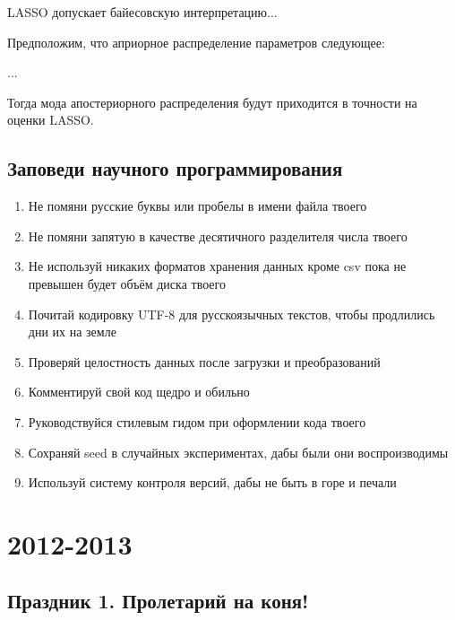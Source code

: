 \documentclass[12pt, a4paper]{article}\usepackage[]{graphicx}\usepackage[]{color}
\begin{document}
LASSO допускает байесовскую интерпретацию...

Предположим, что априорное распределение параметров следующее:

...


Тогда мода апостериорного распределения будут приходится в точности на оценки LASSO.


\subsection{Заповеди научного программирования}

\begin{enumerate}
\item Не помяни русские буквы или пробелы в имени файла твоего
\item Не помяни запятую в качестве десятичного разделителя числа твоего
\item Не используй никаких форматов хранения данных кроме csv пока не превышен будет объём диска твоего
\item Почитай кодировку UTF-8 для русскоязычных текстов, чтобы продлились дни их на земле
\item Проверяй целостность данных после загрузки и преобразований
\item Комментируй свой код щедро и обильно
\item Руководствуйся стилевым гидом при оформлении кода твоего
\item Сохраняй seed в случайных экспериментах, дабы были они воспроизводимы
\item Используй систему контроля версий, дабы не быть в горе и печали
\end{enumerate}

\nocite{*}
\printbibliography

\section{2012-2013}

\subsection{Праздник 1. Пролетарий на коня!}
\end{document}
